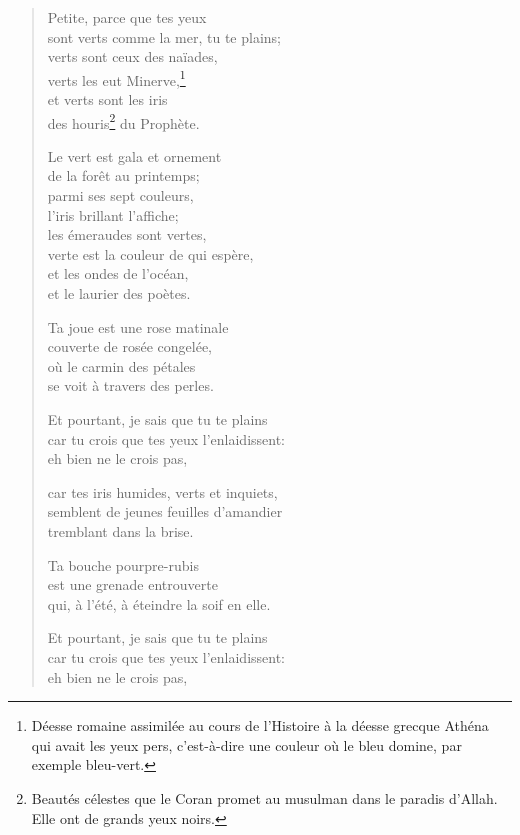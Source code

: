 \begin{verse}
  Petite, parce que tes yeux \\
  sont verts comme la mer, tu te plains; \\
  verts sont ceux des naïades, \\
  verts les eut Minerve,\footnote{Déesse romaine assimilée au cours de
  l'Histoire à la déesse grecque Athéna qui avait les yeux pers,
  c'est-à-dire une couleur où le bleu domine, par exemple bleu-vert.} \\
  et verts sont les iris \\
  des houris\footnote{Beautés célestes que le Coran promet au musulman
  dans le paradis d'Allah. Elle ont de grands yeux noirs.} du
  Prophète.

  Le vert est gala et ornement \\
  de la forêt au printemps; \\
  parmi ses sept couleurs, \\
  l'iris brillant l'affiche; \\
  les émeraudes sont vertes, \\
  verte est la couleur de qui espère, \\
  et les ondes de l'océan, \\
  et le laurier des poètes.

  Ta joue est une rose matinale \\
  couverte de rosée congelée, \\
  où le carmin des pétales \\
  se voit à travers des perles.

  Et pourtant,
  je sais que tu te plains \\
  car tu crois que tes yeux
  l'enlaidissent: \\
  eh bien ne le crois pas,

  car tes iris humides,
  verts et inquiets, \\
  semblent de jeunes feuilles d'amandier \\
  tremblant dans la brise.

  Ta bouche pourpre-rubis \\
  est une grenade entrouverte \\
  qui, à l'été,
  à éteindre la soif en elle.

  Et pourtant,
  je sais que tu te plains \\
  car tu crois que tes yeux
  l'enlaidissent: \\
  eh bien ne le crois pas,


\end{verse}
